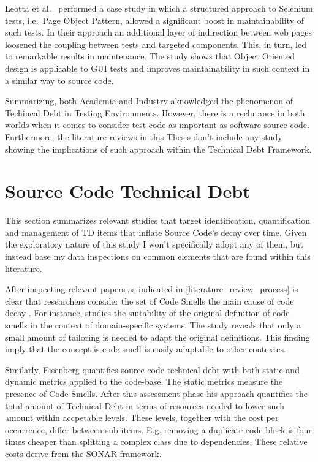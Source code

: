 Leotta et al.\ \cite{pageObjectPattern} performed a case study in which a structured approach to Selenium tests, i.e.\ Page Object Pattern, allowed a significant boost in maintainability of such tests. In their approach an additional layer of indirection between web pages loosened the coupling between tests and targeted components. This, in turn, led to remarkable results in maintenance. The study shows that Object Oriented design is applicable to GUI tests and improves maintainability in such context in a similar way to source code.

Summarizing, both Academia and Industry aknowledged the phenomenon of Techincal Debt in Testing Environments. However, there is a reclutance in both worlds when it comes to consider test code as important as software source code. Furthermore, the literature reviews in this Thesis don't include any study showing the implications of such approach within the Technical Debt Framework.

\section{Source Code Technical Debt} \label{source_code_technical_debt}

This section summarizes relevant studies that target identification, quantification and management of TD items that inflate Source Code's decay over time. Given the exploratory nature of this study I won't specifically adopt any of them, but instead base my data inspections on common elements that are found within this literature.

After inspecting relevant papers as indicated in \ref{literature_review_process} is clear that researchers consider the set of Code Smells \cite{code_smell_definition} the main cause of code decay \cite{mapping_study_td}. For instance, \cite{domain_specific_code_smells} studies the suitability of the original definition of code smells in the context of domain-specific systems. The study reveals that only a small amount of tailoring is needed to adapt the original definitions. This finding imply that the concept is code smell is easily adaptable to other contextes. 

Similarly, Eisenberg \cite{threshold_approach_to_td} quantifies source code technical debt with both static and dynamic metrics applied to the code-base. The static metrics measure the presence of Code Smells. After this assessment phase his approach quantifies the total amount of Technical Debt in terms of resources needed to lower such amount within accpetable levels. These levels, together with the cost per occurrence, differ between sub-items. E.g. removing a duplicate code block is four times cheaper than splitting a complex class due to dependencies. These relative costs derive from the SONAR \cite{sonar_evaluate_td} framework.

